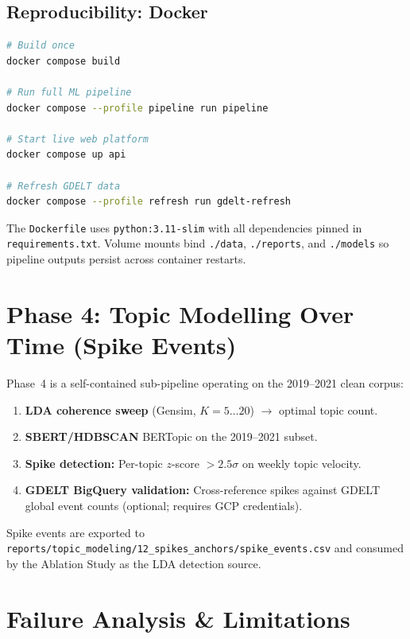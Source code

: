 \documentclass[12pt,a4paper]{article}
\begin{document}
\subsection{Reproducibility: Docker}

\begin{lstlisting}[language=bash, caption=Turn-key deployment with Docker]
# Build once
docker compose build

# Run full ML pipeline
docker compose --profile pipeline run pipeline

# Start live web platform
docker compose up api

# Refresh GDELT data
docker compose --profile refresh run gdelt-refresh
\end{lstlisting}

The \texttt{Dockerfile} uses \texttt{python:3.11-slim} with all dependencies pinned in
\texttt{requirements.txt}. Volume mounts bind \texttt{./data}, \texttt{./reports},
and \texttt{./models} so pipeline outputs persist across container restarts.

\section{Phase 4: Topic Modelling Over Time (Spike Events)}

Phase~4 is a self-contained sub-pipeline operating on the 2019--2021 clean corpus:

\begin{enumerate}[leftmargin=2em]
    \item \textbf{LDA coherence sweep} (Gensim, $K{=}5\ldots20$) $\to$ optimal topic count.
    \item \textbf{SBERT/HDBSCAN} BERTopic on the 2019--2021 subset.
    \item \textbf{Spike detection:} Per-topic $z$-score $> 2.5\sigma$ on weekly topic velocity.
    \item \textbf{GDELT BigQuery validation:} Cross-reference spikes against GDELT global
          event counts (optional; requires GCP credentials).
\end{enumerate}

Spike events are exported to \texttt{reports/topic\_modeling/12\_spikes\_anchors/spike\_events.csv}
and consumed by the Ablation Study as the LDA detection source.

\section{Failure Analysis \& Limitations}
\end{document}
